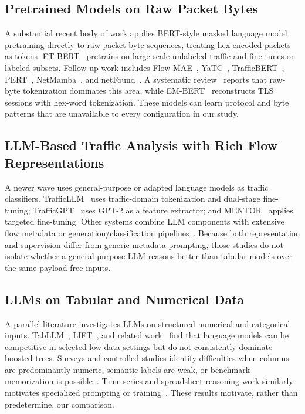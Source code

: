 \documentclass[letterpaper,twocolumn,10pt]{article}
\begin{document}
\subsection{Pretrained Models on Raw Packet Bytes}

A substantial recent body of work applies BERT-style masked language model pretraining directly to raw packet byte sequences, treating hex-encoded packets as tokens. ET-BERT~\cite{lin2022etbert} pretrains on large-scale unlabeled traffic and fine-tunes on labeled subsets. Follow-up work includes Flow-MAE~\cite{hang2023flowmae}, YaTC~\cite{zhao2023yatc}, TrafficBERT~\cite{shi2023trafficbert}, PERT~\cite{he2020pert}, NetMamba~\cite{wang2024netmamba}, and netFound~\cite{guthula2023netfound}. A systematic review~\cite{perejove2026nftm} reports that raw-byte tokenization dominates this area, while EM-BERT~\cite{embert2024} reconstructs TLS sessions with hex-word tokenization. These models can learn protocol and byte patterns that are unavailable to every configuration in our study.

\subsection{LLM-Based Traffic Analysis with Rich Flow Representations}

A newer wave uses general-purpose or adapted language models as traffic classifiers. TrafficLLM~\cite{cui2025trafficllm} uses traffic-domain tokenization and dual-stage fine-tuning; TrafficGPT~\cite{ginige2024trafficgpt} uses GPT-2 as a feature extractor; and MENTOR~\cite{jia2025mentor} applies targeted fine-tuning. Other systems combine LLM components with extensive flow metadata or generation/classification pipelines~\cite{zhang2025llmntd,syndetect2025}. Because both representation and supervision differ from generic metadata prompting, those studies do not isolate whether a general-purpose LLM reasons better than tabular models over the same payload-free inputs.

\subsection{LLMs on Tabular and Numerical Data}

A parallel literature investigates LLMs on structured numerical and categorical inputs. TabLLM~\cite{hegselmann2023tabllm}, LIFT~\cite{dinh2022lift}, and related work~\cite{borisov2022deep,borisov2022language} find that language models can be competitive in selected low-data settings but do not consistently dominate boosted trees. Surveys and controlled studies identify difficulties when columns are predominantly numeric, semantic labels are weak, or benchmark memorization is possible~\cite{fang2024large,bordt2024elephants}. Time-series and spreadsheet-reasoning work similarly motivates specialized prompting or training~\cite{wang2024tabletime,formular12025}. These results motivate, rather than predetermine, our comparison.
\end{document}
